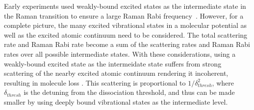 \documentclass[aps,prl,twocolumn,superscriptaddress]{revtex4-1}
\begin{document}
Early experiments used weakly-bound excited states as the intermediate state
in the Raman transition to ensure a large Raman Rabi frequency~\cite{Wynar2000,Rom2004}.
However, for a complete picture, the many excited vibrational states in a molecular potential
as well as the excited atomic continuum need to be considered.
The total scattering rate and Raman Rabi rate become a sum of the scattering rates
and Raman Rabi rates over all possible intermediate states.
With these considerations, using a weakly-bound excited state as the intermeidate state
suffers from strong scattering of the nearby excited atomic continuum rendering it incoherent,
resulting in molecule loss .
This scattering is proportional to $1/\delta_{thresh}^2$,
where $\delta_{thresh}$ is the detuning from the dissociation threshold,
and thus can be made smaller by using deeply bound vibrational states as the intermediate level.

\end{document}
